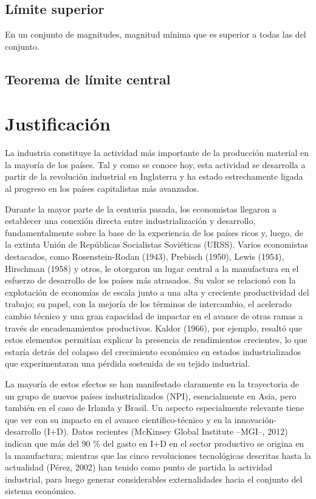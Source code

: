 \subsection{Límite superior} 

En un conjunto de magnitudes, magnitud mínima que es superior a todas las del conjunto. \cite{RAE}

\subsection{Teorema de límite central}



\section{Justificación}

La industria constituye la actividad más importante de la producción material en la mayoría de los países. Tal y como se conoce hoy, esta actividad se desarrolla a partir de la revolución industrial en Inglaterra y ha estado estrechamente ligada al progreso en los países capitalistas más avanzados.

Durante la mayor parte de la centuria pasada, los economistas llegaron a establecer una conexión directa entre industrialización y desarrollo, fundamentalmente sobre la base de la experiencia de los países ricos y, luego, de la extinta Unión de Repúblicas Socialistas Soviéticas (URSS). Varios economistas destacados, como Rosenstein-Rodan (1943), Prebisch (1950), Lewis (1954), Hirschman (1958) y otros, le otorgaron un lugar central a la manufactura en el esfuerzo de desarrollo de los países más atrasados. Su valor se relacionó con la explotación de economías de escala junto a una alta y creciente productividad del trabajo; su papel, con la mejoría de los términos de intercambio, el acelerado cambio técnico y una gran capacidad de impactar en el avance de otras ramas a través de encadenamientos productivos. Kaldor (1966), por ejemplo, resaltó que estos elementos permitían explicar la presencia de rendimientos crecientes, lo que estaría detrás del colapso del crecimiento económico en estados industrializados que experimentaran una pérdida sostenida de su tejido industrial. 



La mayoría de estos efectos se han manifestado claramente en la trayectoria de un grupo de nuevos países industrializados (NPI), esencialmente en Asia, pero también en el caso de Irlanda y Brasil. Un aspecto especialmente relevante tiene que ver con su impacto en el avance científico-técnico y en la innovación-desarrollo (I+D). Datos recientes (McKinsey Global Institute –MGI–, 2012) indican que más del 90 \% del gasto en I+D en el sector productivo se origina en la manufactura; mientras que las cinco revoluciones tecnológicas descritas hasta la actualidad (Pérez, 2002) han tenido como punto de partida la actividad industrial, para luego generar considerables externalidades hacia el conjunto del sistema económico.


